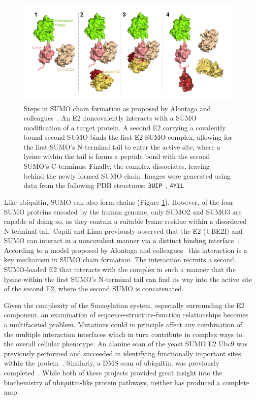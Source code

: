 \begin{figure}[h!]
	\centering
	\includegraphics[width=\textwidth]{img/sumo_chaining.pdf}
	\caption{Steps in SUMO chain formation as proposed by Alontaga and colleagues~\cite{alontaga_rwd_2015}. An E2 noncovalently interacts with a SUMO modification of a target protein. A second E2 carrying a covalently bound second SUMO binds the first E2-SUMO complex, allowing for the first SUMO's N-terminal tail to enter the active site, where a lysine within the tail is forms a peptide bond with the second SUMO's C-terminus. Finally, the complex dissociates, leaving behind the newly formed SUMO chain. Images were generated using data from the following PDB structures: \texttt{3UIP}~\cite{gareau_determinants_2012}, \texttt{4Y1L}~\cite{}}
	\label{fig:sumo_chaining}
\end{figure}

Like ubiquitin, SUMO can also form chains (Figure \ref{fig:sumo_chaining}). However, of the four SUMO proteins encoded by the human genome, only SUMO2 and SUMO3 are capable of doing so, as they contain a suitable lysine residue within a disordered N-terminal tail. Capili and Lima previously observed that the E2 (UBE2I) and SUMO can interact in a noncovalent manner via a distinct binding interface~\cite{capili_structure_2007}. According to a model proposed by Alontaga and colleagues~\cite{alontaga_rwd_2015} this interaction is a key mechanism in SUMO chain formation. The interaction recruits a second, SUMO-loaded E2 that interacts with the complex in such a manner that the lysine within the first SUMO's N-terminal tail can find its way into the active site of the second E2, where the second SUMO is concatenated.



Given the complexity of the Sumoylation system, especially surrounding the E2 component, an examination of sequence-structure-function relationships becomes a multifaceted problem. Mutations could in principle affect any combination of the multiple interaction interfaces which in turn contribute in complex ways to the overall cellular phenotype.
An alanine scan of the yeast SUMO E2 Ubc9 was previously performed and succeeded in identifying functionally important sites within the protein~\cite{20}. Similarly, a DMS scan of ubiquitin, was previously completed~\cite{21}. While both of these projects provided great insight into the biochemistry of ubiquitin-like protein pathways, neither has produced a complete map.
